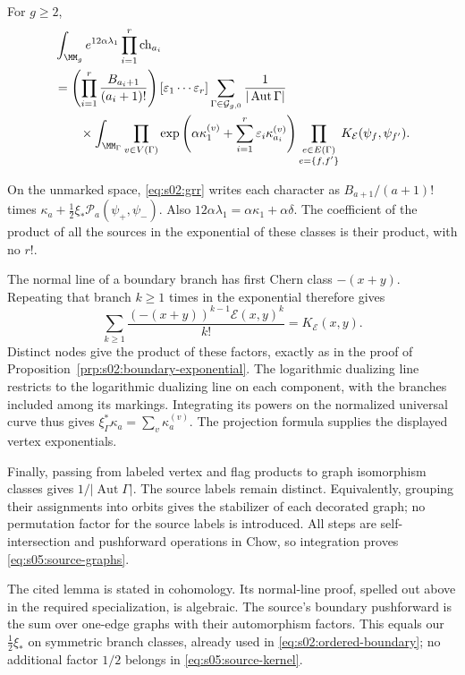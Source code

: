 \begin{lmm}\label{lmm:s05:labelled-sources}
For $g\geq2$,
\begin{align}
 &\int_{\MM_g}e^{12\alpha\lambda_1}
              \prod_{i=1}^r\mathrm{ch}_{a_i}\notag\\
 &=\left(\prod_{i=1}^r\frac{B_{a_i+1}}{(a_i+1)!}\right)
 [\varepsilon_1\cdots\varepsilon_r]
 \sum_{\Gamma\in\mathcal G_{g,0}}
 \frac1{|\operatorname{Aut}\Gamma|}\notag\\
 &\qquad\times\int_{\MM_\Gamma}
 \prod_{v\in V(\Gamma)}
  \exp\left(\alpha\kappa_1^{(v)}+
          \sum_{i=1}^r\varepsilon_i\kappa_{a_i}^{(v)}\right)
 \prod_{\substack{e\in E(\Gamma)\\e=\{f,f'\}}}
       K_{\mathcal E}(\psi_f,\psi_{f'}).
 \label{eq:s05:source-graphs}
\end{align}
\end{lmm}
\begin{prf}
On the unmarked space, \eqref{eq:s02:grr} writes each character as
$B_{a+1}/(a+1)!$ times
$\kappa_a+\tfrac12\xi_*\mathcal P_a(\psi_+,\psi_-)$.
Also $12\alpha\lambda_1=\alpha\kappa_1+\alpha\delta$.
The coefficient of the product of all the sources in the
exponential of these classes is their product, with no $r!$.

The normal line of a boundary branch has first Chern class
$-(x+y)$. Repeating that branch $k\geq1$ times in the exponential
therefore gives
\[
 \sum_{k\geq1}\frac{(-(x+y))^{k-1}\mathcal E(x,y)^k}{k!}
 =K_{\mathcal E}(x,y).
\]
Distinct nodes give the product of these factors, exactly as in the
proof of Proposition~\ref{prp:s02:boundary-exponential}. The
logarithmic dualizing line restricts to the logarithmic dualizing
line on each component, with the branches included among its
markings. Integrating its powers on the normalized universal curve
thus gives $\xi_\Gamma^*\kappa_a=\sum_v\kappa_a^{(v)}$.
The projection formula supplies the displayed vertex exponentials.

Finally, passing from labeled vertex and flag products to graph
isomorphism classes gives $1/|\operatorname{Aut}\Gamma|$.
The source labels remain distinct. Equivalently, grouping their
assignments into orbits gives the stabilizer of each decorated
graph; no permutation factor for the source labels is introduced.
All steps are self-intersection and pushforward operations in Chow,
so integration proves \eqref{eq:s05:source-graphs}.
\end{prf}

\begin{rmk}
The cited lemma is stated in cohomology. Its normal-line proof,
spelled out above in the required specialization, is algebraic.
The source's boundary pushforward is the sum over one-edge graphs
with their automorphism factors. This equals our
$\tfrac12\xi_*$ on symmetric branch classes, already used in
\eqref{eq:s02:ordered-boundary}; no additional factor $1/2$ belongs
in \eqref{eq:s05:source-kernel}.
\end{rmk}

